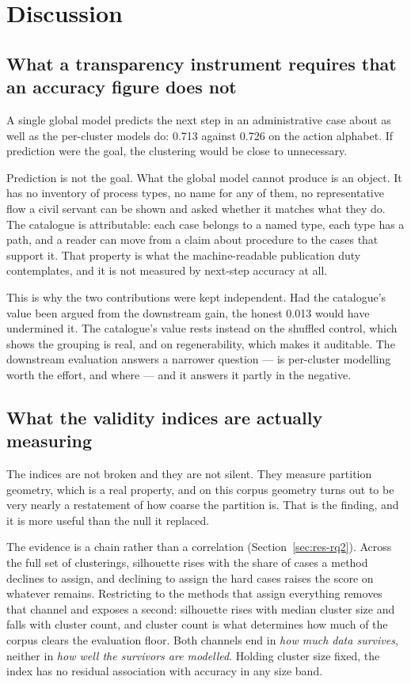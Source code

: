 \section{Discussion}\label{sec:discussion}

\subsection{What a transparency instrument requires that an accuracy figure does not}

A single global model predicts the next step in an administrative case about as well as the
per-cluster models do: 0.713 against 0.726 on the action alphabet. If prediction were the goal,
the clustering would be close to unnecessary.

Prediction is not the goal. What the global model cannot produce is an object. It has no
inventory of process types, no name for any of them, no representative flow a civil servant can
be shown and asked whether it matches what they do. The catalogue is attributable: each case
belongs to a named type, each type has a path, and a reader can move from a claim about
procedure to the cases that support it. That property is what the machine-readable publication
duty contemplates, and it is not measured by next-step accuracy at all.

This is why the two contributions were kept independent. Had the catalogue's value been argued
from the downstream gain, the honest 0.013 would have undermined it. The catalogue's value rests
instead on the shuffled control, which shows the grouping is real, and on regenerability, which
makes it auditable. The downstream evaluation answers a narrower question --- is per-cluster
modelling worth the effort, and where --- and it answers it partly in the negative.

\subsection{What the validity indices are actually measuring}

The indices are not broken and they are not silent. They measure partition geometry, which is a
real property, and on this corpus geometry turns out to be very nearly a restatement of how
coarse the partition is. That is the finding, and it is more useful than the null it replaced.

The evidence is a chain rather than a correlation (Section~\ref{sec:res-rq2}). Across the full
set of clusterings, silhouette rises with the share of cases a method declines to assign, and
declining to assign the hard cases raises the score on whatever remains. Restricting to the
methods that assign everything removes that channel and exposes a second: silhouette rises with
median cluster size and falls with cluster count, and cluster count is what determines how much
of the corpus clears the evaluation floor. Both channels end in \emph{how much data survives},
neither in \emph{how well the survivors are modelled}. Holding cluster size fixed, the index has
no residual association with accuracy in any size band.

